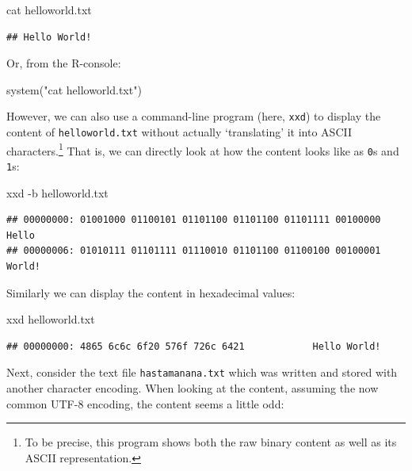\documentclass[
  12pt,
]{style/krantz}
\newenvironment{Shaded}{\begin{snugshade}}{\end{snugshade}}
\newcommand{\AttributeTok}[1]{\textcolor[rgb]{0.77,0.63,0.00}{#1}}
\newcommand{\ExtensionTok}[1]{#1}
\newcommand{\FunctionTok}[1]{\textcolor[rgb]{0.00,0.00,0.00}{#1}}
\newcommand{\NormalTok}[1]{#1}
\newcommand{\StringTok}[1]{\textcolor[rgb]{0.31,0.60,0.02}{#1}}
\begin{document}
\begin{Shaded}
\begin{Highlighting}[]
\FunctionTok{cat}\NormalTok{ helloworld.txt}
\end{Highlighting}
\end{Shaded}

\begin{verbatim}
## Hello World!
\end{verbatim}

Or, from the R-console:

\begin{Shaded}
\begin{Highlighting}[]
\FunctionTok{system}\NormalTok{(}\StringTok{"cat helloworld.txt"}\NormalTok{)}
\end{Highlighting}
\end{Shaded}

However, we can also use a command-line program (here, \texttt{xxd}) to display the content of \texttt{helloworld.txt} without actually `translating' it into ASCII characters.\footnote{To be precise, this program shows both the raw binary content as well as its ASCII representation.} That is, we can directly look at how the content looks like as \texttt{0}s and \texttt{1}s:

\begin{Shaded}
\begin{Highlighting}[]
\ExtensionTok{xxd} \AttributeTok{{-}b}\NormalTok{ helloworld.txt}
\end{Highlighting}
\end{Shaded}

\begin{verbatim}
## 00000000: 01001000 01100101 01101100 01101100 01101111 00100000  Hello 
## 00000006: 01010111 01101111 01110010 01101100 01100100 00100001  World!
\end{verbatim}

Similarly we can display the content in hexadecimal values:

\begin{Shaded}
\begin{Highlighting}[]
\ExtensionTok{xxd}\NormalTok{  helloworld.txt}
\end{Highlighting}
\end{Shaded}

\begin{verbatim}
## 00000000: 4865 6c6c 6f20 576f 726c 6421            Hello World!
\end{verbatim}

Next, consider the text file \texttt{hastamanana.txt} which was written and stored with another character encoding. When looking at the content, assuming the now common UTF-8 encoding, the content seems a little odd:
\end{document}
